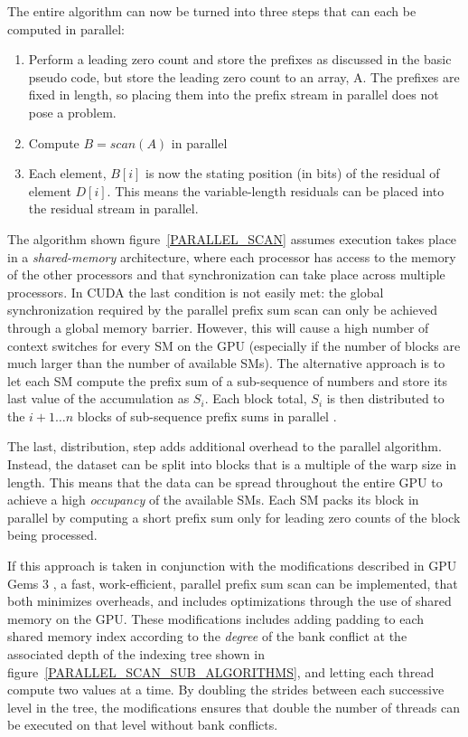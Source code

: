  The entire algorithm can now be turned into three steps that can each be computed in parallel:
 \begin{enumerate}
  \item Perform a leading zero count and store the prefixes as discussed in the basic pseudo code, but store the leading zero count to an array, A. The prefixes are fixed in length, so placing them
  into the prefix stream in parallel does not pose a problem.
  \item Compute $B = scan(A)$ in parallel
  \item Each element, $B[i]$ is now the stating position (in bits) of the residual of element $D[i]$. This means the variable-length residuals can be placed into the residual stream in parallel.
 \end{enumerate}
 
 The algorithm shown figure~\ref{PARALLEL_SCAN} assumes execution takes place in a \textit{shared-memory} architecture, where each processor has access to the memory of the other processors and that synchronization
 can take place across multiple processors. In CUDA the last condition is not easily met: the global synchronization required by the parallel prefix sum scan can only be achieved through a global memory barrier. 
 However, this will cause a high number of context switches for every SM on the GPU (especially if the number of blocks are much larger than the number of available SMs). The alternative approach is to let each SM
 compute the prefix sum of a sub-sequence of numbers and store its last value of the accumulation as $S_{i}$. Each block total, $S_{i}$ is then distributed to the $i+1\dots n$ blocks of sub-sequence prefix sums in 
 parallel \cite{harris2007parallel}.
 
 The last, distribution, step adds additional overhead to the parallel algorithm. Instead, the dataset can be split into blocks that is a multiple of the warp size in length. This means that the data can be
 spread throughout the entire GPU to achieve a high \textit{occupancy} of the available SMs. Each SM packs its block in parallel by computing a short prefix sum only for leading zero counts of the block 
 being processed. 
 
 If this approach is taken in conjunction with the modifications described in GPU Gems 3 \cite{harris2007parallel}, a fast, work-efficient, parallel prefix sum scan can be implemented, that both minimizes overheads, and 
 includes optimizations through the use of shared memory on the GPU. These modifications includes adding padding  to each shared memory index according to the \textit{degree} of the bank conflict at the associated 
 depth of the indexing tree shown in figure~\ref{PARALLEL_SCAN_SUB_ALGORITHMS}, and letting each thread compute two values at a time. By doubling the strides between each successive level in the tree, the modifications 
 ensures that double the number of threads can be executed on that level without bank conflicts. 
 
